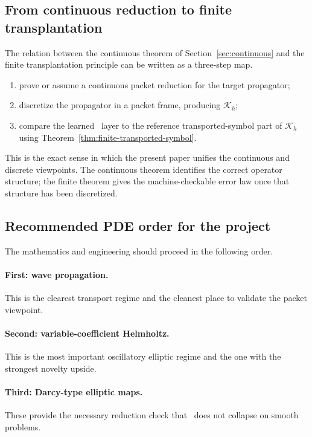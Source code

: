 \subsection{From continuous reduction to finite transplantation}

The relation between the continuous theorem of Section~\ref{sec:continuous} and the finite transplantation principle can be written as a three-step map.
\begin{enumerate}
\item prove or assume a continuous packet reduction for the target propagator;
\item discretize the propagator in a packet frame, producing $\mathcal K_h$;
\item compare the learned \MiNO\ layer to the reference transported-symbol part of $\mathcal K_h$ using Theorem~\ref{thm:finite-transported-symbol}.
\end{enumerate}
This is the exact sense in which the present paper unifies the continuous and discrete viewpoints. The continuous theorem identifies the correct operator structure; the finite theorem gives the machine-checkable error law once that structure has been discretized.

\subsection{Recommended PDE order for the project}

The mathematics and engineering should proceed in the following order.

\paragraph{First: wave propagation.}
This is the clearest transport regime and the cleanest place to validate the packet viewpoint.

\paragraph{Second: variable-coefficient Helmholtz.}
This is the most important oscillatory elliptic regime and the one with the strongest novelty upside.

\paragraph{Third: Darcy-type elliptic maps.}
These provide the necessary reduction check that \MiNO\ does not collapse on smooth problems.

